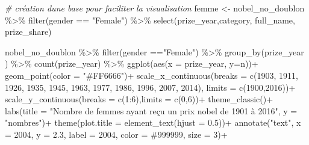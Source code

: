 \documentclass[
]{article}
\newenvironment{Shaded}{\begin{snugshade}}{\end{snugshade}}
\newcommand{\AttributeTok}[1]{\textcolor[rgb]{0.77,0.63,0.00}{#1}}
\newcommand{\CommentTok}[1]{\textcolor[rgb]{0.56,0.35,0.01}{\textit{#1}}}
\newcommand{\DecValTok}[1]{\textcolor[rgb]{0.00,0.00,0.81}{#1}}
\newcommand{\FloatTok}[1]{\textcolor[rgb]{0.00,0.00,0.81}{#1}}
\newcommand{\FunctionTok}[1]{\textcolor[rgb]{0.00,0.00,0.00}{#1}}
\newcommand{\NormalTok}[1]{#1}
\newcommand{\OtherTok}[1]{\textcolor[rgb]{0.56,0.35,0.01}{#1}}
\newcommand{\SpecialCharTok}[1]{\textcolor[rgb]{0.00,0.00,0.00}{#1}}
\newcommand{\StringTok}[1]{\textcolor[rgb]{0.31,0.60,0.02}{#1}}
\begin{document}
\begin{Shaded}
\begin{Highlighting}[]
\CommentTok{\# création d\textquotesingle{}une base pour faciliter la visualisation }
\NormalTok{femme }\OtherTok{\textless{}{-}}\NormalTok{ nobel\_no\_doublon }\SpecialCharTok{\%\textgreater{}\%} 
  \FunctionTok{filter}\NormalTok{(gender }\SpecialCharTok{==} \StringTok{"Female"}\NormalTok{) }\SpecialCharTok{\%\textgreater{}\%} 
  \FunctionTok{select}\NormalTok{(prize\_year,category, full\_name, prize\_share)}

\NormalTok{nobel\_no\_doublon }\SpecialCharTok{\%\textgreater{}\%} 
  \FunctionTok{filter}\NormalTok{(gender }\SpecialCharTok{==}\StringTok{"Female"}\NormalTok{) }\SpecialCharTok{\%\textgreater{}\%} 
  \FunctionTok{group\_by}\NormalTok{(prize\_year ) }\SpecialCharTok{\%\textgreater{}\%} 
  \FunctionTok{count}\NormalTok{(prize\_year) }\SpecialCharTok{\%\textgreater{}\%}  
  \FunctionTok{ggplot}\NormalTok{(}\FunctionTok{aes}\NormalTok{(}\AttributeTok{x =}\NormalTok{ prize\_year, }\AttributeTok{y=}\NormalTok{n))}\SpecialCharTok{+}
  \FunctionTok{geom\_point}\NormalTok{(}\AttributeTok{color =} \StringTok{"\#FF6666"}\NormalTok{)}\SpecialCharTok{+} 
  \FunctionTok{scale\_x\_continuous}\NormalTok{(}\AttributeTok{breaks =} \FunctionTok{c}\NormalTok{(}\DecValTok{1903}\NormalTok{, }\DecValTok{1911}\NormalTok{, }\DecValTok{1926}\NormalTok{, }\DecValTok{1935}\NormalTok{, }\DecValTok{1945}\NormalTok{, }\DecValTok{1963}\NormalTok{, }\DecValTok{1977}\NormalTok{, }\DecValTok{1986}\NormalTok{, }\DecValTok{1996}\NormalTok{, }\DecValTok{2007}\NormalTok{, }\DecValTok{2014}\NormalTok{),}
                     \AttributeTok{limits =} \FunctionTok{c}\NormalTok{(}\DecValTok{1900}\NormalTok{,}\DecValTok{2016}\NormalTok{))}\SpecialCharTok{+}
  \FunctionTok{scale\_y\_continuous}\NormalTok{(}\AttributeTok{breaks =} \FunctionTok{c}\NormalTok{(}\DecValTok{1}\SpecialCharTok{:}\DecValTok{6}\NormalTok{),}\AttributeTok{limits =} \FunctionTok{c}\NormalTok{(}\DecValTok{0}\NormalTok{,}\DecValTok{6}\NormalTok{))}\SpecialCharTok{+}
  \FunctionTok{theme\_classic}\NormalTok{()}\SpecialCharTok{+}
  \FunctionTok{labs}\NormalTok{(}\AttributeTok{title =} \StringTok{"Nombre de femmes ayant reçu un prix nobel de 1901 à 2016"}\NormalTok{, }\AttributeTok{y =} \StringTok{"nombres"}\NormalTok{)}\SpecialCharTok{+}
  \FunctionTok{theme}\NormalTok{(}\AttributeTok{plot.title =} \FunctionTok{element\_text}\NormalTok{(}\AttributeTok{hjust =} \FloatTok{0.5}\NormalTok{))}\SpecialCharTok{+}
  \FunctionTok{annotate}\NormalTok{(}\StringTok{"text"}\NormalTok{, }\AttributeTok{x =} \DecValTok{2004}\NormalTok{, }\AttributeTok{y =} \FloatTok{2.3}\NormalTok{, }\AttributeTok{label =} \DecValTok{2004}\NormalTok{, }\AttributeTok{color =} \StringTok{\textquotesingle{}\#999999\textquotesingle{}}\NormalTok{, }\AttributeTok{size =} \DecValTok{3}\NormalTok{)}\SpecialCharTok{+}

\end{Highlighting}
\end{Shaded}
\end{document}
